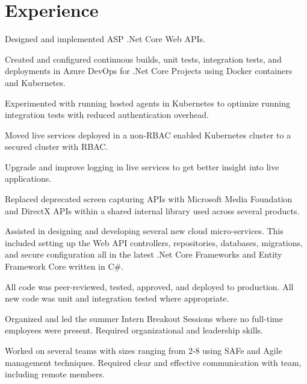\documentclass[]{deedy-resume-openfont}
\begin{document}
\hfill
\begin{minipage}[t]{0.66\textwidth} 


\section{Experience}

\vspace{\topsep} %
\begin{tightemize}
    \item Designed and implemented ASP .Net Core Web APIs.
    \item Created and configured continuous builds, unit tests, integration tests, and deployments in Azure DevOps for .Net Core Projects using Docker containers and Kubernetes. 
    \item Experimented with running hosted agents in Kubernetes to optimize running integration tests with reduced authentication overhead.
    \item Moved live services deployed in a non-RBAC enabled Kubernetes cluster to a secured cluster with RBAC.
    \item Upgrade and improve logging in live services to get better insight into live applications.
    \end{tightemize}
\sectionsep

\vspace{\topsep} %
\begin{tightemize}
    \item Replaced deprecated screen capturing APIs with Microsoft Media Foundation and DirectX APIs within a shared internal library used across several products.
    \item Assisted in designing and developing several new cloud micro-services. This included setting up the Web API controllers, repositories, databases, migrations, and secure configuration all in the latest .Net Core Frameworks and Entity Framework Core written in C\#. 
    \item All code was peer-reviewed, tested, approved, and deployed to production.  All new code was unit and integration tested where appropriate.
    \item Organized and led the summer Intern Breakout Sessions where no full-time employees were present. Required organizational and leadership skills.
    \item Worked on several teams with sizes ranging from 2-8 using SAFe and Agile management techniques. Required clear and effective communication with team, including remote members.
    

\end{tightemize}
\end{minipage}
\end{document}
